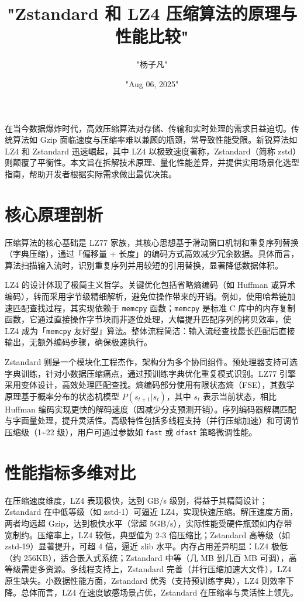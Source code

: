 \title{"Zstandard 和 LZ4 压缩算法的原理与性能比较"}
\author{"杨子凡"}
\date{"Aug 06, 2025"}
\maketitle
在当今数据爆炸时代，高效压缩算法对存储、传输和实时处理的需求日益迫切。传统算法如 Gzip 面临速度与压缩率难以兼顾的瓶颈，常导致性能受限。新锐算法如 LZ4 和 Zstandard 迅速崛起，其中 LZ4 以极致速度著称，Zstandard（简称 zstd）则颠覆了平衡性。本文旨在拆解技术原理、量化性能差异，并提供实用场景化选型指南，帮助开发者根据实际需求做出最优决策。\par
\chapter{核心原理剖析}
压缩算法的核心基础是 LZ77 家族，其核心思想基于滑动窗口机制和重复序列替换（字典压缩），通过「偏移量 + 长度」的编码方式高效减少冗余数据。具体而言，算法扫描输入流时，识别重复序列并用较短的引用替换，显著降低数据体积。\par
LZ4 的设计体现了极简主义哲学。关键优化包括省略熵编码（如 Huffman 或算术编码），转而采用字节级精细解析，避免位操作带来的开销。例如，使用哈希链加速匹配查找过程，其实现依赖于 \texttt{memcpy} 函数；\texttt{memcpy} 是标准 C 库中的内存复制函数，它通过直接操作字节块而非逐位处理，大幅提升匹配序列的拷贝效率，使 LZ4 成为「\texttt{memcpy} 友好型」算法。整体流程简洁：输入流经查找最长匹配后直接输出，无额外编码步骤，确保极速执行。\par
Zstandard 则是一个模块化工程杰作，架构分为多个协同组件。预处理器支持可选字典训练，针对小数据压缩痛点，通过预训练字典优化重复模式识别。LZ77 引擎采用变体设计，高效处理匹配查找。熵编码部分使用有限状态熵（FSE），其数学原理基于概率分布的状态机模型 $P(s_{t+1} | s_t)$，其中 $s_t$ 表示当前状态，相比 Huffman 编码实现更快的解码速度（因减少分支预测开销）。序列编码器解耦匹配与字面量处理，提升灵活性。高级特性包括多线程支持（并行压缩加速）和可调节压缩级（1\~{}22 级），用户可通过参数如 \texttt{fast} 或 \texttt{dfast} 策略微调性能。\par
\chapter{性能指标多维对比}
在压缩速度维度，LZ4 表现极快，达到 GB/s 级别，得益于其精简设计；Zstandard 在中低等级（如 zstd-1）可逼近 LZ4，实现快速压缩。解压速度方面，两者均远超 Gzip，达到极快水平（常超 5GB/s），实际性能受硬件瓶颈如内存带宽制约。压缩率上，LZ4 较低，典型值为 2-3 倍压缩比；Zstandard 高等级（如 zstd-19）显著提升，可超 4 倍，逼近 zlib 水平。内存占用差异明显：LZ4 极低（约 256KB），适合嵌入式系统；Zstandard 中等（几 MB 到几百 MB 可调），高等级需更多资源。多线程支持上，Zstandard 完善（并行压缩加速大文件），LZ4 原生缺失。小数据性能方面，Zstandard 优秀（支持预训练字典），LZ4 则效率下降。总体而言，LZ4 在速度敏感场景占优，Zstandard 在压缩率与灵活性上领先。\par
